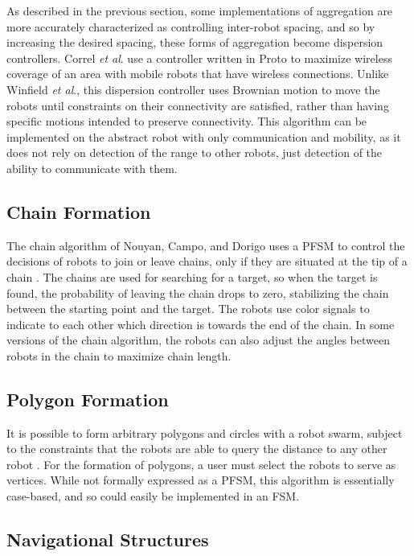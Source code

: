 \documentclass[]{article}
\begin{document}
As described in the previous section, some implementations of aggregation are more accurately characterized as controlling inter-robot spacing, and so by increasing the desired spacing, these forms of aggregation become dispersion controllers. 
Correl \textit{et al}. use a controller written in Proto to maximize wireless coverage of an area with mobile robots that have wireless connections.
Unlike Winfield \textit{et al}., this dispersion controller uses Brownian motion to move the robots until constraints on their connectivity are satisfied, rather than having specific motions intended to preserve connectivity. 
This algorithm can be implemented on the abstract robot with only communication and mobility, as it does not rely on detection of the range to other robots, just detection of the ability to communicate with them. 

\subsection{Chain Formation}

The chain algorithm of Nouyan, Campo, and Dorigo uses a PFSM to control the decisions of robots to join or leave chains, only if they are situated at the tip of a chain \cite{nouyan2008path}. 
The chains are used for searching for a target, so when the target is found, the probability of leaving the chain drops to zero, stabilizing the chain between the starting point and the target. 
The robots use color signals to indicate to each other which direction is towards the end of the chain. 
In some versions of the chain algorithm, the robots can also adjust the angles between robots in the chain to maximize chain length. 

\subsection{Polygon Formation}

It is possible to form arbitrary polygons and circles with a robot swarm, subject to the constraints that the robots are able to query the distance to any other robot \cite{sugihara1996distributed}.
For the formation of polygons, a user must select the robots to serve as vertices. 
While not formally expressed as a PFSM, this algorithm is essentially case-based, and so could easily be implemented in an FSM. 

\subsection{Navigational Structures}
\end{document}
